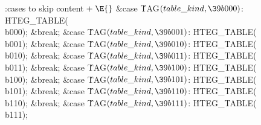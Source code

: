 \Y\B\4:cases to skip content\X${}\mathrel+\E{}$\6
\4\&{case} \.{TAG}${}(\index{table kind+\\{table\_kind}}\\{table\_kind},\39\\{b000}){}$:\5
\.{HTEG\_TABLE}(\\{b000});\5
\&{break};\6
\4\&{case} \.{TAG}${}(\index{table kind+\\{table\_kind}}\\{table\_kind},\39\\{b001}){}$:\5
\.{HTEG\_TABLE}(\\{b001});\5
\&{break};\6
\4\&{case} \.{TAG}${}(\index{table kind+\\{table\_kind}}\\{table\_kind},\39\\{b010}){}$:\5
\.{HTEG\_TABLE}(\\{b010});\5
\&{break};\6
\4\&{case} \.{TAG}${}(\index{table kind+\\{table\_kind}}\\{table\_kind},\39\\{b011}){}$:\5
\.{HTEG\_TABLE}(\\{b011});\5
\&{break};\6
\4\&{case} \.{TAG}${}(\index{table kind+\\{table\_kind}}\\{table\_kind},\39\\{b100}){}$:\5
\.{HTEG\_TABLE}(\\{b100});\5
\&{break};\6
\4\&{case} \.{TAG}${}(\index{table kind+\\{table\_kind}}\\{table\_kind},\39\\{b101}){}$:\5
\.{HTEG\_TABLE}(\\{b101});\5
\&{break};\6
\4\&{case} \.{TAG}${}(\index{table kind+\\{table\_kind}}\\{table\_kind},\39\\{b110}){}$:\5
\.{HTEG\_TABLE}(\\{b110});\5
\&{break};\6
\4\&{case} \.{TAG}${}(\index{table kind+\\{table\_kind}}\\{table\_kind},\39\\{b111}){}$:\5
\.{HTEG\_TABLE}(\\{b111});\5
